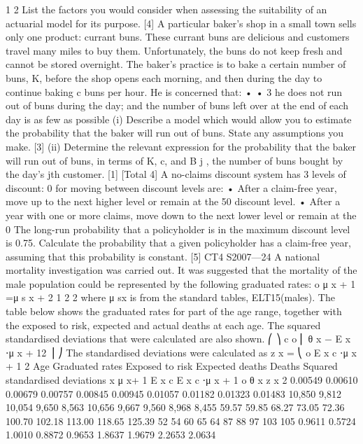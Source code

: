 \documentclass[a4paper,12pt]{article}
\begin{document}
\begin{enumerate}
1
2
List the factors you would consider when assessing the suitability of an actuarial
model for its purpose.
[4]
A particular baker’s shop in a small town sells only one product: currant buns. These
currant buns are delicious and customers travel many miles to buy them.
Unfortunately, the buns do not keep fresh and cannot be stored overnight.
The baker’s practice is to bake a certain number of buns, K, before the shop opens
each morning, and then during the day to continue baking c buns per hour. He is
concerned that:
•
•
3
he does not run out of buns during the day; and
the number of buns left over at the end of each day is as few as possible
(i) Describe a model which would allow you to estimate the probability that the
baker will run out of buns. State any assumptions you make.
[3]
(ii) Determine the relevant expression for the probability that the baker will run
out of buns, in terms of K, c, and B j , the number of buns bought by the day’s
jth customer.
[1]
[Total 4]
A no-claims discount system has 3 levels of discount: 0%
for moving between discount levels are:
• After a claim-free year, move up to the next higher level or remain at the 50%
discount level.
• After a year with one or more claims, move down to the next lower level or
remain at the 0%
The long-run probability that a policyholder is in the maximum discount level is 0.75.
Calculate the probability that a given policyholder has a claim-free year, assuming
that this probability is constant.
[5]
CT4 S2007—24
A national mortality investigation was carried out. It was suggested that the mortality
of the male population could be represented by the following graduated rates:
o
μ x + 1 =μ s x + 2 1
2
2
where μ sx is from the standard tables, ELT15(males).
The table below shows the graduated rates for part of the age range, together with the
exposed to risk, expected and actual deaths at each age. The squared standardised
deviations that were calculated are also shown.
⎛
⎞
c o
⎜ θ x − E x ⋅μ x + 12 ⎟
⎠
The standardised deviations were calculated as z x = ⎝
o
E x c ⋅μ x + 1
2
Age Graduated
rates
Exposed
to risk Expected
deaths Deaths Squared
standardised
deviations
x μ x+ 1 E x c E x c ⋅μ x + 1 o θ x z x 2
0.00549
0.00610
0.00679
0.00757
0.00845
0.00945
0.01057
0.01182
0.01323
0.01483 10,850
9,812
10,054
9,650
8,563
10,656
9,667
9,560
8,968
8,455 59.57
59.85
68.27
73.05
72.36
100.70
102.18
113.00
118.65
125.39 52
54
60
65
64
87
88
97
103
105 0.9611
0.5724
1.0010
0.8872
0.9653
1.8637
1.9679
2.2653
2.0634

\end{enumerate}
\end{document}
